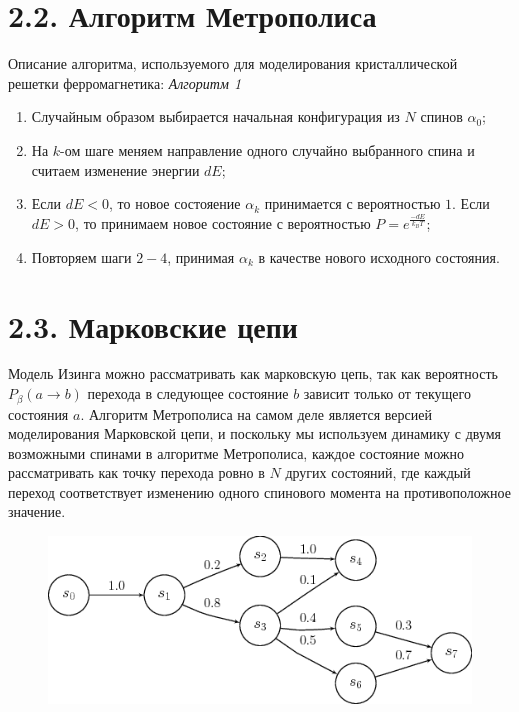 \documentclass[12pt]{report}
\theoremstyle{definition}
\begin{document}
\section{2.2. Алгоритм Метрополиса}
Описание алгоритма, используемого для моделирования кристаллической решетки ферромагнетика:
\emph{Алгоритм 1}
\begin{enumerate}
    \item Случайным образом выбирается начальная конфигурация из $N$ спинов $\alpha_0$;
    \item На $k$-ом шаге меняем направление одного случайно выбранного спина и считаем изменение энергии $dE$;
    \item Если $dE < 0$, то новое состояение $\alpha_k$ принимается с вероятностью $1$. 
    Если $dE > 0$, то принимаем новое состояние с вероятностью $P = e^{\frac{-dE}{k_B T}}$;
    \item Повторяем шаги $2-4$, принимая $\alpha_k$ в качестве нового исходного состояния.
    \label{alg_metropolis}
\end{enumerate}
\newpage
\section{2.3. Марковские цепи}
Модель Изинга можно рассматривать как марковскую цепь, так как вероятность $P_{\beta}(a \rightarrow b)$ перехода в следующее состояние
$b$ зависит только от текущего состояния $a$. Алгоритм Метрополиса на самом деле является версией моделирования Марковской цепи, и поскольку мы используем динамику с двумя возможными
спинами в алгоритме Метрополиса, каждое состояние можно рассматривать как точку перехода ровно в $N$ других состояний, где каждый переход соответствует изменению одного спинового момента
на противоположное значение.


\begin{figure}[htbp]
    \centering
    \includegraphics[scale=0.5]{img/markov_chain.png}
\end{figure}
\end{document}
